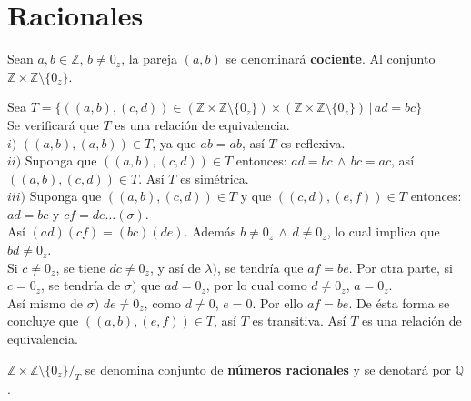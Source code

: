 \section{Racionales}
\begin{definition}
  Sean $a,b \in \mathbb{Z}$, $b \neq 0_z$, la pareja $(a,b)$ se denominará
  \textbf{cociente}. Al conjunto $\mathbb{Z} \times \mathbb{Z} \setminus \{0_z\}$.
\end{definition}
Sea $T = \{ ((a,b),(c,d)) \in (\mathbb{Z} \times \mathbb{Z} \setminus\{0_z\})
\times (\mathbb{Z} \times \mathbb{Z} \setminus\{0_z\}) \, | \, ad = bc \}$ \\
Se verificará que $T$ es una relación de equivalencia.\\
$i)$ $((a,b), (a,b)) \in T$, ya que $ab=ab$, así $T$ es reflexiva. \\
$ii)$ Suponga que $((a,b),(c,d)) \in T$
entonces: $ad=bc \, \land \, bc=ac$, así $((a,b), (c,d)) \in T$. Así $T$ es
simétrica. \\
$iii)$ Suponga que $((a,b),(c,d))\in T$ y que $((c,d),(e,f))\in T$ entonces: $ad
= bc$ y $cf = de \ldots (\sigma)$. \\
Así $(ad)(cf) = (bc)(de)$. Además $b \neq 0_z \, \land \, d \neq 0_z$, lo cual
implica que $bd \neq 0_z$. \\
Si $c \neq 0_z$, se tiene $dc \neq 0_z$, y así de $\lambda)$, se tendría que $af
=be$. Por otra parte, si $c = 0_z$, se tendría de $\sigma)$ que $ad = 0_z$, por
lo cual como $d \neq 0_z$, $a= 0_z$. \\
Así mismo de $\sigma)$ $de \neq 0_z$, como $d \neq 0$, $e=0$. Por ello $af=be$.
De ésta forma se concluye que $((a,b),(e,f))\in T$, así $T$ es transitiva. Así
$T$ es una relación de equivalencia. \\
\begin{definition}
  $\mathbb{Z} \times \mathbb{Z} \setminus \{0_z\} /_T$ se denomina conjunto de
  \textbf{números racionales} y se denotará por $\mathbb{Q}$.
\end{definition}

